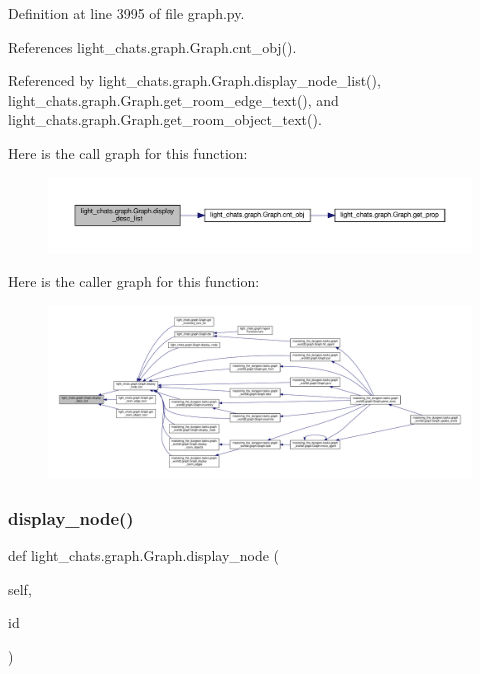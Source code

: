 Definition at line 3995 of file graph.\+py.



References light\+\_\+chats.\+graph.\+Graph.\+cnt\+\_\+obj().



Referenced by light\+\_\+chats.\+graph.\+Graph.\+display\+\_\+node\+\_\+list(), light\+\_\+chats.\+graph.\+Graph.\+get\+\_\+room\+\_\+edge\+\_\+text(), and light\+\_\+chats.\+graph.\+Graph.\+get\+\_\+room\+\_\+object\+\_\+text().

Here is the call graph for this function\+:
\nopagebreak
\begin{figure}[H]
\begin{center}
\leavevmode
\includegraphics[width=350pt]{classlight__chats_1_1graph_1_1Graph_a32111f6e4bae319c37f6d8de8dd2bbbe_cgraph}
\end{center}
\end{figure}
Here is the caller graph for this function\+:
\nopagebreak
\begin{figure}[H]
\begin{center}
\leavevmode
\includegraphics[width=350pt]{classlight__chats_1_1graph_1_1Graph_a32111f6e4bae319c37f6d8de8dd2bbbe_icgraph}
\end{center}
\end{figure}
\mbox{\label{classlight__chats_1_1graph_1_1Graph_a34711f0bfabab728aa51d45bbde67580}} 
\subsubsection{\texorpdfstring{display\+\_\+node()}{display\_node()}}
{\footnotesize\ttfamily def light\+\_\+chats.\+graph.\+Graph.\+display\+\_\+node (\begin{DoxyParamCaption}\item[{}]{self,  }\item[{}]{id }\end{DoxyParamCaption})}



